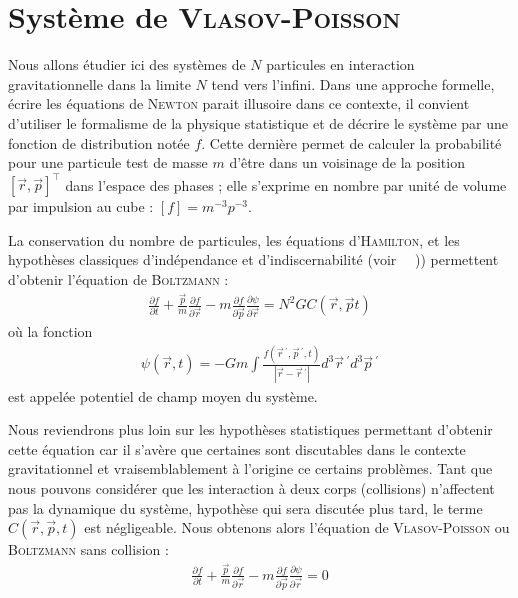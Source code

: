 \section{Syst\`{e}me de \textsc{Vlasov}-\textsc{Poisson}}

	Nous allons \'{e}tudier ici des syst\`{e}mes de $N$ particules en interaction gravitationnelle dans la limite $N$ tend vers l'infini.
	Dans une approche formelle, \'{e}crire les \'{e}quations de \textsc{Newton} parait illusoire dans ce contexte, il convient d'utiliser le formalisme de la physique statistique et de d\'{e}crire le syst\`{e}me par une fonction de distribution not\'{e}e $f$.
	Cette derni\`{e}re permet de calculer la probabilit\'{e} pour une particule test de masse $m$ d'\^{e}tre dans un voisinage de la
	position $\left[\vec{r},\vec{p}\right]^\top$ dans l'espace des phases ; elle
	s'exprime en nombre par unit\'{e} de volume par impulsion au cube : $\left[ f\right] = m^{-3}p^{-3}$.

	La conservation du nombre de particules, les \'{e}quations d'\textsc{Hamilton}, et les hypoth\`{e}ses classiques d'ind\'{e}pendance et d'indiscernabilit\'{e} (voir ~\cite{CoursJP}~)) permettent d'obtenir l'\'{e}quation de \textsc{Boltzmann} :
	\begin{align}
		\frac{\partial f}{\partial t} +\frac{\vec{p}}{m}\frac{\partial f}{\partial \vec{r}} - m\frac{\partial f}{\partial \vec{p}} \frac{\partial \psi}{\partial \vec{r}} = N^2 G C(\vec{r},\vec{p} t)
		\label{Fok-Plan}
	\end{align}
	o\`{u} la fonction
	\begin{align}
		\psi(\vec{r},t)=-Gm\int\frac{f(\vec{r}\,^{\prime},\vec{p}\,^{\prime}, t)}
		{\left|\vec{r}-\vec{r}\,^{\prime}\right|}
		d^3\vec{r}\,^{\prime}d^3\vec{p}\,^{\prime}
		\label{pot-grav}
	\end{align}
	est appel\'{e}e potentiel de champ moyen du syst\`{e}me.
	
	Nous reviendrons plus loin sur les hypoth\`{e}ses statistiques permettant d'obtenir cette \'{e}quation car il s'av\`{e}re que certaines sont discutables dans le contexte gravitationnel et vraisemblablement \`{a} l'origine ce certains probl\`{e}mes. Tant que nous pouvons consid\'{e}rer que les  interaction \`{a} deux corps (collisions) n'affectent pas la dynamique du syst\`{e}me, hypoth\`{e}se qui sera discut\'{e}e plus tard, le
	terme  $ C(\vec{r},\vec{p}, t) $ est n\'{e}gligeable. Nous obtenons alors l'\'{e}quation de
	\textsc{Vlasov-Poisson} ou \textsc{Boltzmann} sans collision :
	\begin{align}
		\frac{\partial f}{\partial t} +\frac{\vec{p}}{m}\frac{\partial f}{\partial \vec{r}} - m\frac{\partial f}{\partial \vec{p}} \frac{\partial \psi}{\partial \vec{r}} = 0
		\label{Vla-Pois}
	\end{align}

